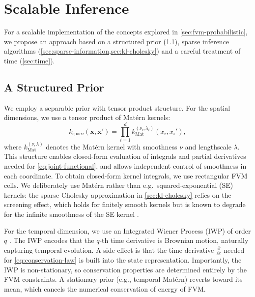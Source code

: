 \documentclass{article}
\theoremstyle{plain}
\theoremstyle{definition}
\theoremstyle{remark}
\begin{document}
\section{Scalable Inference}
\label{sec:sparse-inference}

For a scalable implementation of the concepts explored in \cref{sec:fvm-probabilistic}, we propose an approach based on a structured prior (\cref{sec:structured-prior}), sparse inference algorithms (\cref{sec:sparse-information,sec:kl-cholesky}) and a careful treatment of time (\cref{sec:time}).

\subsection{A Structured Prior}
\label{sec:structured-prior}

We employ a separable prior with tensor product structure.
For the spatial dimensions, we use a tensor product of Mat\'ern kernels:
\begin{equation}
  k_{\text{space}}(\bm{x}, \bm{x}') = \prod_{i=1}^{d} k_{\text{Mat}}^{(\nu_i, \lambda_i)}(x_i, x_i'),
  \label{eq:kernel-space}
\end{equation}
where $k_{\text{Mat}}^{(\nu, \lambda)}$ denotes the Mat\'ern kernel with smoothness $\nu$ and lengthscale $\lambda$.
This structure enables closed-form evaluation of integrals \citep{briolDictionaryClosedFormKernel2025} and partial derivatives needed for \cref{eq:joint-functional}, and allows independent control of smoothness in each coordinate.
To obtain closed-form kernel integrals, we use rectangular FVM cells.
We deliberately use Mat\'ern rather than e.g.\ squared-exponential (SE) kernels: the sparse Cholesky approximation in \cref{sec:kl-cholesky} relies on the screening effect, which holds for finitely smooth kernels but is known to degrade for the infinite smoothness of the SE kernel \citep{schaferSparseCholeskyFactorization2021a}.

For the temporal dimension, we use an Integrated Wiener Process (IWP) of order $q$ \citep{schoberProbabilisticModelNumerical2019}.
The IWP encodes that the $q$-th time derivative is Brownian motion, naturally capturing temporal evolution.
A side effect is that the time derivative $\frac{\partial}{\partial t}$ needed for \cref{eq:conservation-law} is built into the state representation.
Importantly, the IWP is non-stationary, so conservation properties are determined entirely by the FVM constraints.
A stationary prior (e.g., temporal Mat\'ern) reverts toward its mean, which cancels the numerical conservation of energy of FVM.
\end{document}
